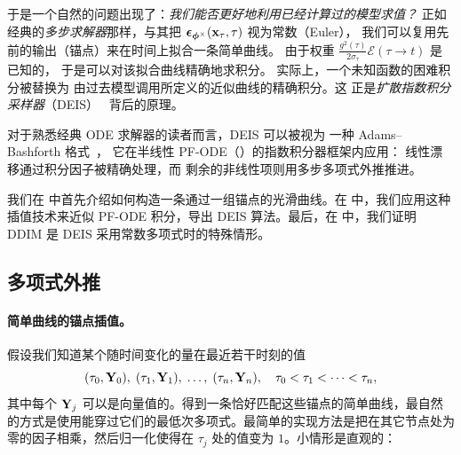 于是一个自然的问题出现了：\emph{我们能否更好地利用已经计算过的模型求值？}
正如经典的\emph{多步求解器}那样，与其把
${\bm{\epsilon}}_{\bm{\phi}^\times}({\mathbf{x}}_\tau,\tau)$ 视为常数（Euler），
我们可以复用先前的输出（锚点）来在时间上拟合一条简单曲线。
由于权重
$\tfrac{g^2(\tau)}{2\sigma_\tau}\mathcal{E}(\tau \to  t)$ 是已知的，
于是可以对该拟合曲线精确地求积分。
实际上，一个未知函数的困难积分被替换为
由过去模型调用所定义的近似曲线的精确积分。这
正是\emph{扩散指数积分采样器}（DEIS）~\citep{zhang2022fast} 背后的原理。

对于熟悉经典 ODE 求解器的读者而言，DEIS 可以被视为
一种 Adams--Bashforth 格式~\citep{iserles2009first}，
它在半线性 PF-ODE（）的指数积分器框架内应用：
线性漂移通过积分因子被精确处理，而
剩余的非线性项则用多步多项式外推推进。

我们在  中首先介绍如何构造一条通过一组锚点的光滑曲线。在  中，我们应用这种插值技术来近似 PF-ODE 积分，导出 DEIS 算法。最后，在  中，我们证明 DDIM 是 DEIS 采用常数多项式时的特殊情形。


\subsection{多项式外推}
\label{subsec:poly-extrapolation}

\paragraph{简单曲线的锚点插值。}
假设我们知道某个随时间变化的量在最近若干时刻的值
\[
(\tau_0,{\mathbf{Y}}_0),\;(\tau_1,{\mathbf{Y}}_1),\;\ldots,\;(\tau_n,{\mathbf{Y}}_n),
\quad \tau_0<\tau_1<\cdots<\tau_n,
\]
其中每个 ${\mathbf{Y}}_j$ 可以是向量值的。得到一条恰好匹配这些锚点的简单曲线，最自然的方式是使用能穿过它们的最低次多项式。最简单的实现方法是把在其它节点处为零的因子相乘，然后归一化使得在 $\tau_j$ 处的值变为 $1$。小情形是直观的：

